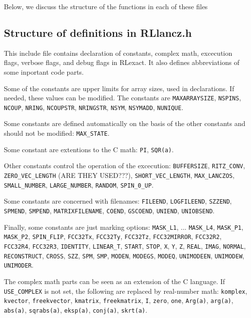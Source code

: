 \documentclass{article}
\begin{document}
Below, we discuss the structure of the functions in each of these files

\subsection{Structure of definitions in RLlancz.h}
This include file contains declaration of constants, complex math, excecution flags, verbose flags, and debug flags in RLexact. It also defines abbreviations of some inportant code parts.

Some of the constants are upper limits for array sizes, used in declarations. If needed, these values can be modified. The constants are \verb+MAXARRAYSIZE+, \verb+NSPINS+, \verb+NCOUP+, \verb+NRING+, \verb+NCOUPSTR+, \verb+NRINGSTR+, \verb+NSYM+, \verb+NSYMADD+, \verb+NUNIQUE+.

Some constants are defined automatically on the basis of the other constants and should not be modified:
\verb+MAX_STATE+.

Some constant are extentions to the C math:
\verb+PI+, \verb+SQR(a)+.

Other constants control the operation of the excecution:
\verb+BUFFERSIZE+, \verb+RITZ_CONV+, \verb+ZERO_VEC_LENGTH+  (ARE THEY USED???), \verb+SHORT_VEC_LENGTH+, \verb+MAX_LANCZOS+, \verb+SMALL_NUMBER+, \verb+LARGE_NUMBER+, \verb+RANDOM+, \verb+SPIN_0_UP+.

Some constants are concerned with filenames:
\verb+FILEEND+, \verb+LOGFILEEND+, \verb+SZZEND+, \verb+SPMEND+, \verb+SMPEND+, \verb+MATRIXFILENAME+, \verb+COEND+, \verb+GSCOEND+, \verb+UNIEND+, \verb+UNIOBSEND+.

Finally, some constants are just marking options:
\verb+MASK_L1+, ... \verb+MASK_L4+, \verb+MASK_P1+, \verb+MASK_P2+, \verb+SPIN_FLIP+, \verb+FCC32Tx+, \verb+FCC32Ty+, \verb+FCC32Tz+, \verb+FCC32MIRROR+, \verb+FCC32R2+, \verb+FCC32R4+, \verb+FCC32R3+, \verb+IDENTITY+, \verb+LINEAR_T+, \verb+START+, \verb+STOP+, \verb+X+, \verb+Y+, \verb+Z+, \verb+REAL+, \verb+IMAG+, \verb+NORMAL+, \verb+RECONSTRUCT+, \verb+CROSS+, \verb+SZZ+, \verb+SPM+, \verb+SMP+, \verb+MODEN+, \verb+MODEGS+, \verb+MODEQ+, \verb+UNIMODEEN+, \verb+UNIMODEW+, \verb+UNIMODER+.

The complex math parts can be seen as an extension of the C language. If \verb+USE_COMPLEX+ is not set, the following are replaced by real-number math:
\verb+komplex+, \verb+kvector+, \verb+freekvector+, \verb+kmatrix+, \verb+freekmatrix+, \verb+I+, \verb+zero+, \verb+one+, \verb+Arg(a)+, \verb+arg(a)+, \verb+abs(a)+, \verb+sqrabs(a)+, \verb+eksp(a)+, \verb+conj(a)+, \verb+skrt(a)+.
\end{document}
